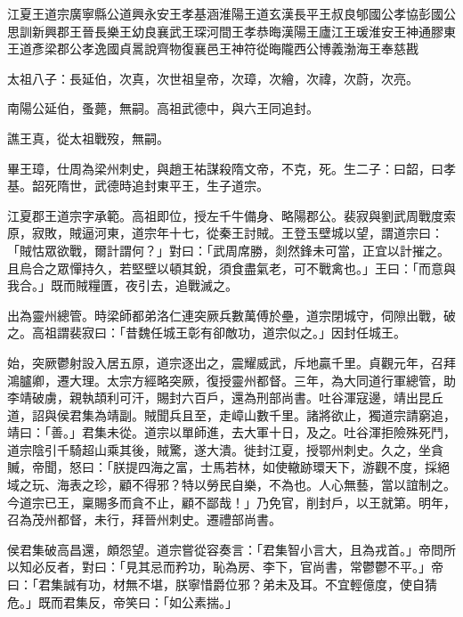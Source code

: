 
\begin{pinyinscope}

 江夏王道宗廣寧縣公道興永安王孝基涵淮陽王道玄漢長平王叔良郇國公孝協彭國公思訓新興郡王晉長樂王幼良襄武王琛河間王孝恭晦漢陽王廬江王瑗淮安王神通膠東王道彥梁郡公孝逸國貞暠說齊物復襄邑王神符從晦隴西公博義渤海王奉慈戡



 太祖八子：長延伯，次真，次世祖皇帝，次璋，次繪，次禕，次蔚，次亮。



 南陽公延伯，蚤薨，無嗣。高祖武德中，與六王同追封。



 譙王真，從太祖戰歿，無嗣。



 畢王璋，仕周為梁州刺史，與趙王祐謀殺隋文帝，不克，死。生二子：曰韶，曰孝基。韶死隋世，武德時追封東平王，生子道宗。



 江夏郡王道宗字承範。高祖即位，授左千牛備身、略陽郡公。裴寂與劉武周戰度索原，寂敗，賊逼河東，道宗年十七，從秦王討賊。王登玉壁城以望，謂道宗曰：「賊怙眾欲戰，爾計謂何？」對曰：「武周席勝，剡然鋒未可當，正宜以計摧之。且烏合之眾憚持久，若堅壁以頓其銳，須食盡氣老，可不戰禽也。」王曰：「而意與我合。」既而賊糧匱，夜引去，追戰滅之。



 出為靈州總管。時梁師都弟洛仁連突厥兵數萬傅於壘，道宗閉城守，伺隙出戰，破之。高祖謂裴寂曰：「昔魏任城王彰有卻敵功，道宗似之。」因封任城王。



 始，突厥鬱射設入居五原，道宗逐出之，震耀威武，斥地贏千里。貞觀元年，召拜鴻臚卿，遷大理。太宗方經略突厥，復授靈州都督。三年，為大同道行軍總管，助李靖破虜，親執頡利可汗，賜封六百戶，還為刑部尚書。吐谷渾寇邊，靖出昆丘道，詔與侯君集為靖副。賊聞兵且至，走嶂山數千里。諸將欲止，獨道宗請窮追，靖曰：「善。」君集未從。道宗以單師進，去大軍十日，及之。吐谷渾拒險殊死鬥，道宗陰引千騎超山乘其後，賊驚，遂大潰。徙封江夏，授鄂州刺史。久之，坐貪贓，帝聞，怒曰：「朕提四海之富，士馬若林，如使轍跡環天下，游觀不度，採絕域之玩、海表之珍，顧不得邪？特以勞民自樂，不為也。人心無藝，當以誼制之。今道宗已王，稟賜多而貪不止，顧不鄙哉！」乃免官，削封戶，以王就第。明年，召為茂州都督，未行，拜晉州刺史。遷禮部尚書。



 侯君集破高昌還，頗怨望。道宗嘗從容奏言：「君集智小言大，且為戎首。」帝問所以知必反者，對曰：「見其忌而矜功，恥為房、李下，官尚書，常鬱鬱不平。」帝曰：「君集誠有功，材無不堪，朕寧惜爵位邪？弟未及耳。不宜輕億度，使自猜危。」既而君集反，帝笑曰：「如公素揣。」




\end{pinyinscope}
